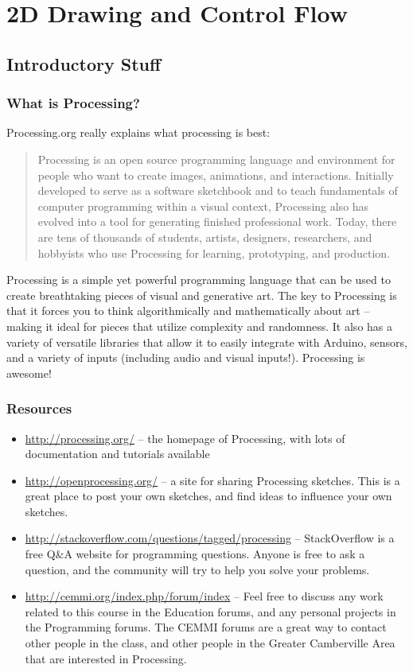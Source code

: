 \section{2D Drawing and Control Flow}

\subsection{Introductory Stuff}
\subsubsection{What is Processing?}
Processing.org really explains what processing is best:

\begin{quote}
Processing is an open source programming language and environment for people who want to create images, animations, and interactions. Initially developed to serve as a software sketchbook and to teach fundamentals of computer programming within a visual context, Processing also has evolved into a tool for generating finished professional work. Today, there are tens of thousands of students, artists, designers, researchers, and hobbyists who use Processing for learning, prototyping, and production.
\end{quote}

Processing is a simple yet powerful programming language that can be used to create breathtaking pieces of visual and generative art.  The key to Processing is that it forces you to think algorithmically and mathematically about art -- making it ideal for pieces that utilize complexity and randomness.  It also has a variety of versatile libraries that allow it to easily integrate with Arduino, sensors, and a variety of inputs (including audio and visual inputs!).  Processing is awesome!

\subsubsection{Resources}
\begin{itemize}
\item \url{http://processing.org/} -- the homepage of Processing, with lots of documentation and tutorials available
\item \url{http://openprocessing.org/} -- a site for sharing Processing sketches.  This is a great place to post your own sketches, and find ideas to influence your own sketches.
\item \url{http://stackoverflow.com/questions/tagged/processing} -- StackOverflow is a free Q\&A website for programming questions.  Anyone is free to ask a question, and the community will try to help you solve your problems.
\item \url{http://cemmi.org/index.php/forum/index} -- Feel free to discuss any work related to this course in the Education forums, and any personal projects in the Programming forums.  The CEMMI forums are a great way to contact other people in the class, and other people in the Greater Camberville Area that are interested in Processing.
\end{itemize}

